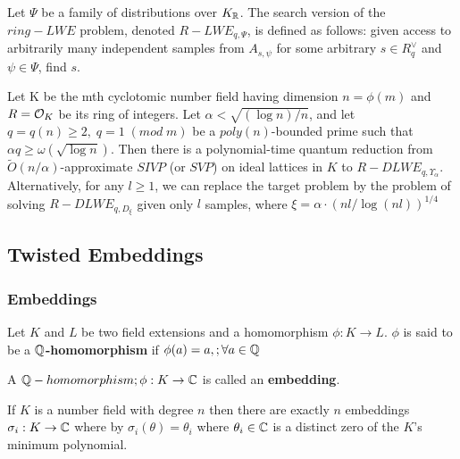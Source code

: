 \documentclass[a4paper,12pt]{article}
\begin{document}
\begin{definition}
  \label{def:rlwe-search}
Let $\Psi$ be a family of distributions over $K_{\mathbb{R}}$. The search version of the $ring-LWE$ problem, denoted $R-LWE_{q,\Psi}$, is defined as follows: given access to arbitrarily many independent samples from $A_{s,\psi}$ for some arbitrary $s \in R_q^\vee$ and $\psi \in \Psi$, find $s$.
\end{definition}

\begin{theorem}
  Let K be the mth cyclotomic number field having dimension $n = \phi(m)$ and $R =
  \mathcal{O}_K$ be its ring of integers. Let $\alpha < \sqrt{(\log{n})/n}$, and let $q = q(n)
  \geq 2, \; q = 1 \; (mod \; m)$ be a $poly(n)$-bounded prime such that $\alpha q \geq
  \omega(\sqrt{\log{n}})$. Then there is a polynomial-time quantum reduction from
  $\tilde{O}(n/\alpha)$-approximate $SIVP$ (or $SVP$) on ideal lattices in $K$ to
  $R-DLWE_{q,\Upsilon_\alpha}$. Alternatively, for any $l \geq 1$, we can replace the target
  problem by the problem of solving $R-DLWE_{q,D_\xi}$ given only $l$ samples,
  where $\xi = \alpha \cdot ( nl/ \log{(nl)} )^{1/4}$
\end{theorem}

\subsection{Twisted Embeddings}
\label{sec:org88320a4}
\subsubsection{Embeddings}
\label{sec:org50b0c0b}

\begin{definition}
Let $K$ and $L$ be two field extensions and a homomorphism $\phi: K \rightarrow L$. $\phi$ is said to be a \textbf{$\mathbb{Q}$-homomorphism} if $\phi(a) = a, ; \forall a \in \mathbb{Q}$ 
\end{definition}

\begin{definition}
A $\mathbb{Q}-homomorphism ; \phi: K \rightarrow \mathbb{C}$ is called an \textbf{embedding}.
\end{definition}

\begin{theorem}
 If $K$ is a number field with degree $n$ then there are
exactly $n$ embeddings $\sigma_i : K \rightarrow \mathbb{C}$ where by $\sigma_i(\theta) =
\theta_i$ where $\theta_i \in \mathbb{C}$ is a distinct zero of the $K$'s
minimum polynomial.
\end{theorem}
\end{document}
